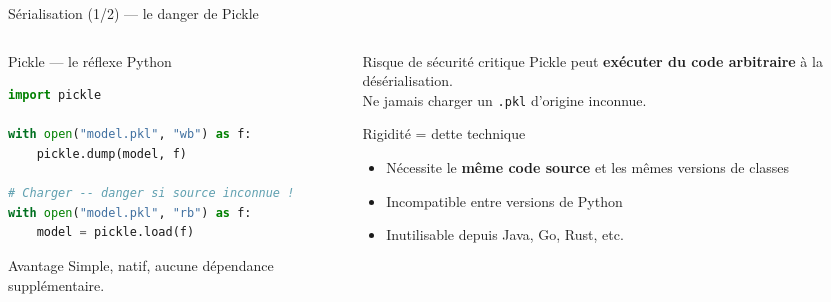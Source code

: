 \documentclass[aspectratio=169, 10pt]{beamer}
\begin{document}
\begin{frame}[fragile]{Sérialisation (1/2) --- le danger de Pickle}
  \begin{columns}[T]
    \begin{column}{0.52\textwidth}
      \begin{block}{Pickle --- le réflexe Python}
\begin{lstlisting}[language=Python]
import pickle

with open("model.pkl", "wb") as f:
    pickle.dump(model, f)

# Charger -- danger si source inconnue !
with open("model.pkl", "rb") as f:
    model = pickle.load(f)
\end{lstlisting}
      \end{block}
      \vspace{2pt}
      \begin{exampleblock}{Avantage}
        Simple, natif, aucune dépendance supplémentaire.
      \end{exampleblock}
    \end{column}
    \begin{column}{0.44\textwidth}
      \begin{alertblock}{Risque de sécurité critique}
        Pickle peut \textbf{exécuter du code arbitraire}
        à la désérialisation.\\[4pt]
        Ne jamais charger un \texttt{.pkl} d'origine inconnue.
      \end{alertblock}
      \smallskip
      \begin{alertblock}{Rigidité = dette technique}
        \begin{itemize}
          \item Nécessite le \textbf{même code source}
                et les mêmes versions de classes
          \item Incompatible entre versions de Python
          \item Inutilisable depuis Java, Go, Rust, etc.
        \end{itemize}
      \end{alertblock}
    \end{column}
  \end{columns}
\end{frame}
\end{document}
